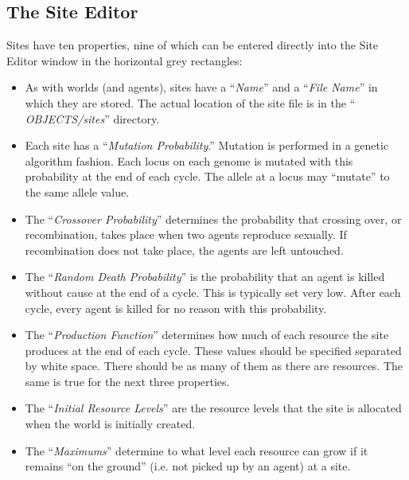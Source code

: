 \subsection{The Site Editor}
\label{site-editor}

Sites have ten properties, nine of which can be entered directly into
the Site Editor window in the horizontal grey rectangles:

\begin{itemize}

\item
As with worlds (and agents), sites have a ``{\sl Name}''  and a ``{\sl File Name}''  in which they
are stored. The actual location of the site file is in the ``{\sl
OBJECTS/sites}''  directory.

\item
Each site has a ``{\sl Mutation Probability}.'' 
Mutation is performed in a genetic algorithm fashion. Each locus on
each genome is mutated with this probability at the end of each
cycle. The allele at a locus may ``mutate'' to the same allele value.

\item
The ``{\sl Crossover Probability}'' 
 determines the probability that
crossing over, or recombination, takes place when two agents reproduce
sexually. If recombination does not take place, the agents are left
untouched.

\item
The ``{\sl Random Death Probability}''  is the
probability that an agent is killed without cause at the end of a
cycle. This is typically set very low. After each cycle, every agent
is killed for no reason with this probability.

\item
The ``{\sl Production Function}'' 
determines how much of each resource the site produces at the end of
each cycle. These values should be specified separated by white
space. There should be as many of them as there are resources. The
same is true for the next three properties.

\item
The ``{\sl Initial Resource Levels}''   are the resource levels that
the site is allocated when the world is initially created.

\item
The ``{\sl Maximums}''   determine to what level each resource can grow if it
remains ``on the ground'' (i.e. not picked up by an agent) at a site.


\end{itemize}
